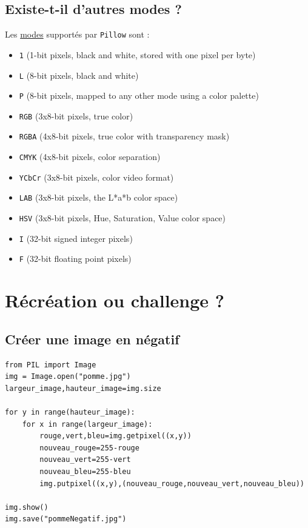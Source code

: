 \documentclass[11pt]{article}
\begin{document}
\subsection{Existe-t-il d'autres modes ?}
\label{sec:org7491b16}

Les \href{https://pillow.readthedocs.io/en/latest/handbook/concepts.html\#modes}{modes} supportés par \texttt{Pillow} sont : 

\begin{itemize}
\item \texttt{1} (1-bit pixels, black and white, stored with one pixel per byte)
\item \texttt{L} (8-bit pixels, black and white)
\item \texttt{P} (8-bit pixels, mapped to any other mode using a color palette)
\item \texttt{RGB} (3x8-bit pixels, true color)
\item \texttt{RGBA} (4x8-bit pixels, true color with transparency mask)
\item \texttt{CMYK} (4x8-bit pixels, color separation)
\item \texttt{YCbCr} (3x8-bit pixels, color video format)
\item \texttt{LAB} (3x8-bit pixels, the L*a*b color space)
\item \texttt{HSV} (3x8-bit pixels, Hue, Saturation, Value color space)
\item \texttt{I} (32-bit signed integer pixels)
\item \texttt{F} (32-bit floating point pixels)
\end{itemize}



\section{Récréation ou challenge ?}
\label{sec:orgeffd373}

\subsection{Créer une image en négatif}
\label{sec:org01d3906}

\begin{verbatim}
from PIL import Image
img = Image.open("pomme.jpg")
largeur_image,hauteur_image=img.size

for y in range(hauteur_image):
    for x in range(largeur_image):
        rouge,vert,bleu=img.getpixel((x,y))
        nouveau_rouge=255-rouge
        nouveau_vert=255-vert
        nouveau_bleu=255-bleu
        img.putpixel((x,y),(nouveau_rouge,nouveau_vert,nouveau_bleu))

img.show()
img.save("pommeNegatif.jpg")
\end{verbatim}
\end{document}

